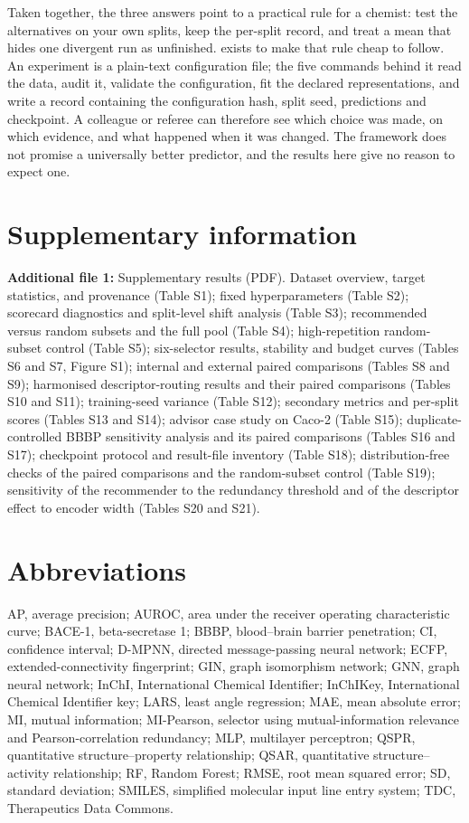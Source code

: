 Taken together, the three answers point to a practical rule for a chemist: test the alternatives on your own splits, keep the per-split record, and treat a mean that hides one divergent run as unfinished. \framework{} exists to make that rule cheap to follow. An experiment is a plain-text configuration file; the five commands behind it read the data, audit it, validate the configuration, fit the declared representations, and write a record containing the configuration hash, split seed, predictions and checkpoint. A colleague or referee can therefore see which choice was made, on which evidence, and what happened when it was changed. The framework does not promise a universally better predictor, and the results here give no reason to expect one.

\section*{Supplementary information}
\textbf{Additional file 1:} Supplementary results (PDF). Dataset overview, target statistics, and provenance (Table S1); fixed hyperparameters (Table S2); scorecard diagnostics and split-level shift analysis (Table S3); recommended versus random subsets and the full pool (Table S4); high-repetition random-subset control (Table S5); six-selector results, stability and budget curves (Tables S6 and S7, Figure S1); internal and external paired comparisons (Tables S8 and S9); harmonised descriptor-routing results and their paired comparisons (Tables S10 and S11); training-seed variance (Table S12); secondary metrics and per-split scores (Tables S13 and S14); advisor case study on Caco-2 (Table S15); duplicate-controlled BBBP sensitivity analysis and its paired comparisons (Tables S16 and S17); checkpoint protocol and result-file inventory (Table S18); distribution-free checks of the paired comparisons and the random-subset control (Table S19); sensitivity of the recommender to the redundancy threshold and of the descriptor effect to encoder width (Tables S20 and S21).

\section*{Abbreviations}
AP, average precision; AUROC, area under the receiver operating characteristic curve; BACE-1, beta-secretase 1; BBBP, blood--brain barrier penetration; CI, confidence interval; D-MPNN, directed message-passing neural network; ECFP, extended-connectivity fingerprint; GIN, graph isomorphism network; GNN, graph neural network; InChI, International Chemical Identifier; InChIKey, International Chemical Identifier key; LARS, least angle regression; MAE, mean absolute error; MI, mutual information; MI-Pearson, selector using mutual-information relevance and Pearson-correlation redundancy; MLP, multilayer perceptron; QSPR, quantitative structure--property relationship; QSAR, quantitative structure--activity relationship; RF, Random Forest; RMSE, root mean squared error; SD, standard deviation; SMILES, simplified molecular input line entry system; TDC, Therapeutics Data Commons.

